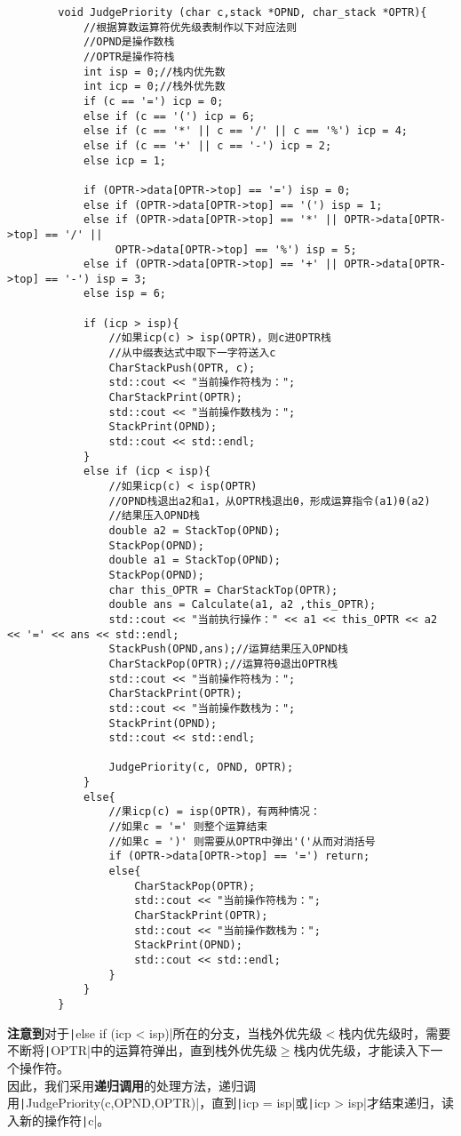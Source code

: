 \documentclass[10pt,a4paper]{article}
\begin{document}
	\begin{verbatim}
		void JudgePriority (char c,stack *OPND, char_stack *OPTR){
			//根据算数运算符优先级表制作以下对应法则
			//OPND是操作数栈
			//OPTR是操作符栈
			int isp = 0;//栈内优先数
			int icp = 0;//栈外优先数
			if (c == '=') icp = 0;
			else if (c == '(') icp = 6;
			else if (c == '*' || c == '/' || c == '%') icp = 4;
			else if (c == '+' || c == '-') icp = 2;
			else icp = 1;
			
			if (OPTR->data[OPTR->top] == '=') isp = 0;
			else if (OPTR->data[OPTR->top] == '(') isp = 1;
			else if (OPTR->data[OPTR->top] == '*' || OPTR->data[OPTR->top] == '/' ||
				 OPTR->data[OPTR->top] == '%') isp = 5;
			else if (OPTR->data[OPTR->top] == '+' || OPTR->data[OPTR->top] == '-') isp = 3;
			else isp = 6;
			
			if (icp > isp){
				//如果icp(c) > isp(OPTR)，则c进OPTR栈
				//从中缀表达式中取下一字符送入c
				CharStackPush(OPTR, c);
				std::cout << "当前操作符栈为：";
				CharStackPrint(OPTR);
				std::cout << "当前操作数栈为：";
				StackPrint(OPND);
				std::cout << std::endl;
			}
			else if (icp < isp){
				//如果icp(c) < isp(OPTR)
				//OPND栈退出a2和a1，从OPTR栈退出θ，形成运算指令(a1)θ(a2)
				//结果压入OPND栈
				double a2 = StackTop(OPND);
				StackPop(OPND);
				double a1 = StackTop(OPND);
				StackPop(OPND);
				char this_OPTR = CharStackTop(OPTR);
				double ans = Calculate(a1, a2 ,this_OPTR);
				std::cout << "当前执行操作：" << a1 << this_OPTR << a2 << '=' << ans << std::endl;
				StackPush(OPND,ans);//运算结果压入OPND栈
				CharStackPop(OPTR);//运算符θ退出OPTR栈
				std::cout << "当前操作符栈为：";
				CharStackPrint(OPTR);
				std::cout << "当前操作数栈为：";
				StackPrint(OPND);
				std::cout << std::endl;
				
				JudgePriority(c, OPND, OPTR);
			}
			else{
				//果icp(c) = isp(OPTR)，有两种情况：
				//如果c = '=' 则整个运算结束
				//如果c = ')' 则需要从OPTR中弹出'('从而对消括号
				if (OPTR->data[OPTR->top] == '=') return;
				else{
					CharStackPop(OPTR);
					std::cout << "当前操作符栈为：";
					CharStackPrint(OPTR);
					std::cout << "当前操作数栈为：";
					StackPrint(OPND);
					std::cout << std::endl;
				}
			}
		}
	\end{verbatim}
	\textbf{注意到}对于\texttt|else if (icp < isp)|所在的分支，当栈外优先级$<$栈内优先级时，需要不断将\texttt|OPTR|中的运算符弹出，直到栈外优先级$\ge$栈内优先级，才能读入下一个操作符。\\
	因此，我们采用\textbf{递归调用}的处理方法，递归调用\texttt|JudgePriority(c,OPND,OPTR)|，直到\texttt|icp = isp|或\texttt|icp > isp|才结束递归，读入新的操作符\texttt|c|。
\end{document}
